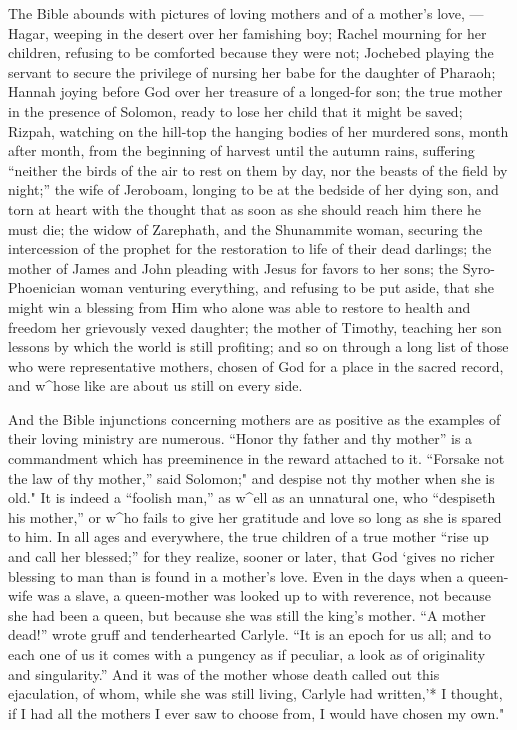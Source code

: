 \documentclass[
]{book}
\begin{document}
The Bible abounds with pictures of loving mothers and of a mother's love, --- Hagar, weeping in the desert over her famishing boy; Rachel mourning for her children, refusing to be comforted because they were not; Jochebed playing the servant to secure the privilege of nursing her babe for the daughter of Pharaoh; Hannah joying before God over her treasure of a longed-for son; the true mother in the presence of Solomon, ready to lose her child that it might be saved; Rizpah, watching on the hill-top the hanging bodies of her murdered sons, month after month, from the beginning of harvest until the autumn rains, suffering ``neither the birds of the air to rest on them by day, nor the beasts of the field by night;'' the wife of Jeroboam, longing to be at the bedside of her dying son, and torn at heart with the thought that as soon as she should reach him there he must die; the widow of Zarephath, and the Shunammite woman, securing the intercession of the prophet for the restoration to life of their dead darlings; the mother of James and John pleading with Jesus for favors to her sons; the Syro-Phoenician woman venturing everything, and refusing to be put aside, that she might win a blessing from Him who alone was able to restore to health and freedom her grievously vexed daughter; the mother of Timothy, teaching her son lessons by which the world is still profiting; and so on through a long list of those who were representative mothers, chosen of God for a place in the sacred record, and w\^{}hose like are about us still on every side.

And the Bible injunctions concerning mothers are as positive as the examples of their loving ministry are numerous. ``Honor thy father and thy mother'' is a commandment which has preeminence in the reward attached to it. ``Forsake not the law of thy mother,'' said Solomon;" and despise not thy mother when she is old." It is indeed a ``foolish man,'' as w\^{}ell as an unnatural one, who ``despiseth his mother,'' or w\^{}ho fails to give her gratitude and love so long as she is spared to him. In all ages and everywhere, the true children of a true mother ``rise up and call her blessed;'' for they realize, sooner or later, that God `gives no richer blessing to man than is found in a mother's love. Even in the days when a queen-wife was a slave, a queen-mother was looked up to with reverence, not because she had been a queen, but because she was still the king's mother. ``A mother dead!'' wrote gruff and tenderhearted Carlyle. ``It is an epoch for us all; and to each one of us it comes with a pungency as if peculiar, a look as of originality and singularity.'' And it was of the mother whose death called out this ejaculation, of whom, while she was still living, Carlyle had written,'* I thought, if I had all the mothers I ever saw to choose from, I would have chosen my own."
\end{document}
